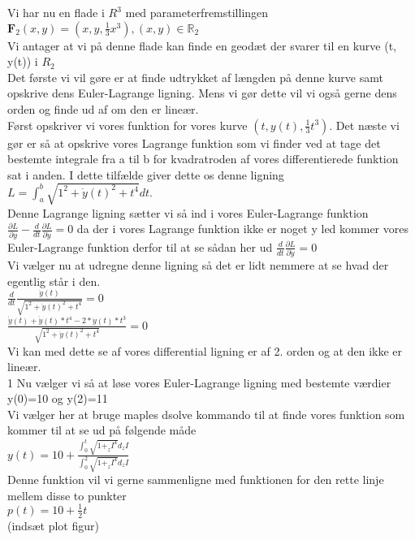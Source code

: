 
Vi har nu en flade i $R^3$ med parameterfremstillingen \\
$\textbf{F}_{2}(x,y)=(x, y, \frac{1}{3}x^3), (x,y) \in \mathbb{R}_{2} $\\
Vi antager at vi på denne flade kan finde en geodæt  der svarer til en kurve (t, y(t)) i $R_{2}$ \\
Det første vi vil gøre er at finde udtrykket af længden på denne kurve samt opskrive dens Euler-Lagrange ligning. Mens vi gør dette vil vi også gerne dens orden og finde ud af om den er lineær. \\
Først opskriver vi vores funktion for vores kurve $(t,y(t), \frac{1}{3} t^3)$. Det næste vi gør er så at opskrive vores Lagrange funktion som vi finder ved at tage det bestemte integrale fra a til b for kvadratroden af vores differentierede funktion sat i anden. I dette tilfælde giver dette os denne ligning \\
$L=\int_{a}^{b} \sqrt{1^2+ \dot{y}(t)^2+t^4}dt. $\\
Denne Lagrange ligning sætter vi så ind i vores Euler-Lagrange funktion $ \frac{ \partial L}{ \partial y}-  \frac{d}{dt} \frac{ \partial L}{ \partial \dot{y}}=0$ da der i vores Lagrange funktion ikke er noget y led kommer vores Euler-Lagrange funktion derfor til at se sådan her ud $ \frac{d}{dt} \frac{ \partial L}{ \partial \dot{y}}=0 $\\
Vi vælger nu at udregne denne ligning så det er lidt nemmere at se hvad der egentlig står i den. \\
$ \frac{d}{dt} \frac{ \dot{y}(t)}{ \sqrt{1^2+ \dot{y}(t)^2+t^4}}=0  $\\
$ \frac{ \dot{ \dot{y}}(t)+ \dot{ \dot{y}}(t)*t^4-2* \dot{y}(t)*t^3}{\sqrt{1^2+ \dot{y}(t)^2+t^4}}=0 $\\
Vi kan med dette se af vores differential ligning er af 2. orden og at den ikke er lineær. \\1
Nu vælger vi så at løse vores Euler-Lagrange ligning med bestemte værdier y(0)=10 og y(2)=11 \\
Vi vælger her at bruge maples dsolve kommando til at finde vores funktion som kommer til at se ud på følgende måde \\
$y(t)=10+ \frac{\int_{0}^{t}\sqrt{1+_zI^4}d_zI}{\int_{0}^{2}\sqrt{1+_zI^4}d_zI} $ \\
Denne funktion vil vi gerne sammenligne med funktionen for den rette linje mellem disse to punkter \\
$p(t)=10+ \frac{1}{2}t $ \\
(indsæt plot figur) \\
